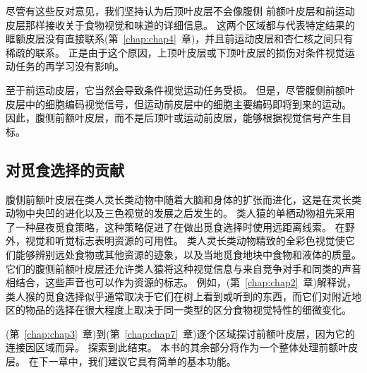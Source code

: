 尽管有这些反对意见，我们坚持认为后顶叶皮层不会像腹侧 前额叶皮层和前运动皮层那样接收关于食物视觉和味道的详细信息。 
这两个区域都与代表特定结果的眶额皮层没有直接联系(第~\ref{chap:chap4}~章)，并且前运动皮层和杏仁核之间只有稀疏的联系\cite{avendan1983evidence}。
正是由于这个原因，上顶叶皮层或下顶叶皮层的损伤对条件视觉运动任务的再学习没有影响\cite{rushworth1997parietal}。
\par 


至于前运动皮层，它当然会导致条件视觉运动任务受损\cite{halsband1985premotor,petrides2019conditional}。
但是，尽管腹侧前额叶皮层中的细胞编码视觉信号，但运动前皮层中的细胞主要编码即将到来的运动\cite{pllegrino1991neurophysiological}。
因此，腹侧前额叶皮层，而不是后顶叶或运动前皮层，能够根据视觉信号产生目标。



\subsection{对觅食选择的贡献}
\par

腹侧前额叶皮层在类人灵长类动物中随着大脑和身体的扩张而进化，这是在灵长类动物中央凹的进化以及三色视觉的发展之后发生的。
类人猿的单栖动物祖先采用了一种昼夜觅食策略，这种策略促进了在做出觅食选择时使用远距离线索。
在野外，视觉和听觉标志表明资源的可用性。
类人灵长类动物精致的全彩色视觉使它们能够辨别远处食物或其他资源的迹象，以及当地觅食地块中食物和液体的质量。
它们的腹侧前额叶皮层还允许类人猿将这种视觉信息与来自竞争对手和同类的声音相结合，这些声音也可以作为资源的标志。
例如，(第~\ref{chap:chap2}~章)解释说，类人猴的觅食选择似乎通常取决于它们在树上看到或听到的东西，而它们对附近地区的物品的选择在很大程度上取决于同一类型的区分食物视觉特性的细微变化。
\par


(第~\ref{chap:chap3}~章)到(第~\ref{chap:chap7}~章)逐个区域探讨前额叶皮层，因为它的连接因区域而异。
探索到此结束。
本书的其余部分将作为一个整体处理前额叶皮层。 
在下一章中，我们建议它具有简单的基本功能。

